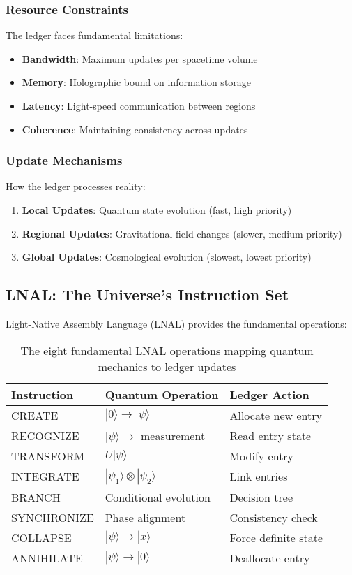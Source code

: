 \documentclass[12pt,letterpaper]{article}
\begin{document}
\subsubsection{Resource Constraints}
The ledger faces fundamental limitations:
\begin{itemize}
    \item \textbf{Bandwidth}: Maximum updates per spacetime volume
    \item \textbf{Memory}: Holographic bound on information storage
    \item \textbf{Latency}: Light-speed communication between regions
    \item \textbf{Coherence}: Maintaining consistency across updates
\end{itemize}

\subsubsection{Update Mechanisms}
How the ledger processes reality:
\begin{enumerate}
    \item \textbf{Local Updates}: Quantum state evolution (fast, high priority)
    \item \textbf{Regional Updates}: Gravitational field changes (slower, medium priority)
    \item \textbf{Global Updates}: Cosmological evolution (slowest, lowest priority)
\end{enumerate}

\subsection{LNAL: The Universe's Instruction Set}

Light-Native Assembly Language (LNAL) provides the fundamental operations:

\begin{table}[h]
\centering
\begin{tabular}{lll}
\toprule
\textbf{Instruction} & \textbf{Quantum Operation} & \textbf{Ledger Action} \\
\midrule
CREATE & $|0\rangle \to |\psi\rangle$ & Allocate new entry \\
RECOGNIZE & $|\psi\rangle \to$ measurement & Read entry state \\
TRANSFORM & $U|\psi\rangle$ & Modify entry \\
INTEGRATE & $|\psi_1\rangle \otimes |\psi_2\rangle$ & Link entries \\
BRANCH & Conditional evolution & Decision tree \\
SYNCHRONIZE & Phase alignment & Consistency check \\
COLLAPSE & $|\psi\rangle \to |x\rangle$ & Force definite state \\
ANNIHILATE & $|\psi\rangle \to |0\rangle$ & Deallocate entry \\
\bottomrule
\end{tabular}
\caption{The eight fundamental LNAL operations mapping quantum mechanics to ledger updates}
\end{table}
\end{document}
